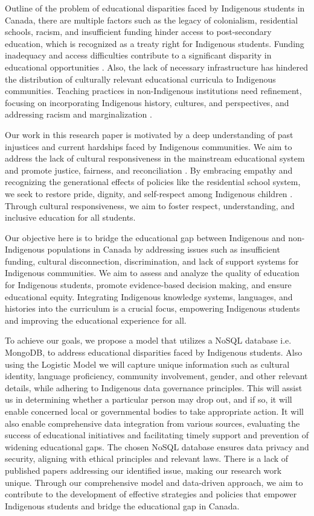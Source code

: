 \documentclass[a4paper,twoside]{article}
\begin{document}
Outline of the problem of educational disparities faced by Indigenous students in Canada, there are multiple factors such as the legacy of colonialism, residential schools, racism, and insufficient funding hinder access to post-secondary education, which is recognized as a treaty right for Indigenous students. Funding inadequacy and access difficulties contribute to a significant disparity in educational opportunities \cite{Brown23}. Also, the lack of necessary infrastructure has hindered the distribution of culturally relevant educational curricula to Indigenous communities. Teaching practices in non-Indigenous institutions need refinement, focusing on incorporating Indigenous history, cultures, and perspectives, and addressing racism and
marginalization \cite{GovtOfCanadaEthics19}.

Our work in this research paper is motivated by a deep understanding of past injustices and current hardships faced by Indigenous communities. We aim to address the lack of cultural responsiveness in the mainstream educational system and promote justice, fairness, and reconciliation \cite{Weston19}. By embracing empathy and recognizing the generational effects of policies like the residential school system, we seek to restore pride, dignity, and self-respect among Indigenous children \cite{Kim19}. Through cultural responsiveness, we aim to foster respect, understanding, and inclusive education for all students.

Our objective here is to bridge the educational gap between Indigenous and non-Indigenous populations in Canada by addressing issues such as insufficient funding, cultural disconnection, discrimination, and lack of support systems for Indigenous communities. We aim to assess and analyze the quality of education for Indigenous students, promote evidence-based decision making, and ensure educational equity. Integrating Indigenous knowledge systems, languages, and histories into the curriculum is a crucial focus, empowering
Indigenous students and improving the educational experience for all.

To achieve our goals, we propose a model that utilizes a NoSQL database
i.e. MongoDB, to address educational disparities faced by Indigenous students.
Also using the Logistic Model we will capture unique information such
as cultural identity, language proficiency, community involvement, gender,
and other relevant details, while adhering to Indigenous data governance
principles. This will assist us in determining whether a particular person
may drop out, and if so, it will enable concerned local or governmental
bodies to take appropriate action. It will also enable comprehensive data
integration from various sources, evaluating the success of educational initiatives and facilitating timely support and prevention of widening educational gaps. The chosen NoSQL database ensures data privacy and security, aligning with ethical principles and relevant laws. There is a lack of published papers addressing our identified issue, making our research work unique. Through our comprehensive model and data-driven approach, we aim to contribute to the development of effective strategies and policies that empower Indigenous students and bridge the educational gap in Canada.
\end{document}

